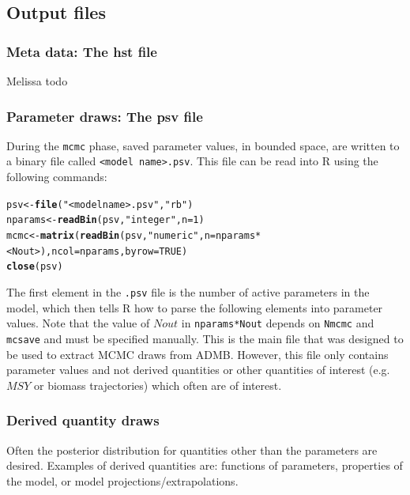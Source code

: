 \documentclass{article}\usepackage[]{graphicx}\usepackage[]{color}
\makeatletter
\newcommand{\hlstr}[1]{\textcolor[rgb]{0.192,0.494,0.8}{#1}}%
\newcommand{\hlkwd}[1]{\textcolor[rgb]{0.737,0.353,0.396}{\textbf{#1}}}%
\newenvironment{kframe}{%
 \def\at@end@of@kframe{}%
 \ifinner\ifhmode%
  \def\at@end@of@kframe{\end{minipage}}%
  \begin{minipage}{\columnwidth}%
 \fi\fi%
 \def\FrameCommand##1{\hskip\@totalleftmargin \hskip-\fboxsep
 \colorbox{shadecolor}{##1}\hskip-\fboxsep
     \hskip-\linewidth \hskip-\@totalleftmargin \hskip\columnwidth}%
 \MakeFramed {\advance\hsize-\width
   \@totalleftmargin\z@ \linewidth\hsize
   \@setminipage}}%
 {\par\unskip\endMakeFramed%
 \at@end@of@kframe}
\newenvironment{knitrout}{}{} %
\makeatother
\begin{document}
\subsection{Output files}\label{sec:outfiles}
\subsubsection{Meta data: The hst file}
Melissa todo
\subsubsection{Parameter draws: The psv file}
During the \texttt{mcmc} phase, saved parameter values, in
bounded space, are written to a binary file called
\texttt{<model name>.psv}. This file can be read into R
using the following commands:
\begin{knitrout}
\color{fgcolor}\begin{kframe}
\begin{alltt}
psv <- \hlkwd{file}(\hlstr{"<model name>.psv"}, \hlstr{"rb"})
nparams <- \hlkwd{readBin}(psv, \hlstr{"integer"}, n=1)
mcmc <- \hlkwd{matrix}(\hlkwd{readBin}(psv, \hlstr{"numeric"}, n=nparams*<Nout>), ncol=nparams, byrow=TRUE)
\hlkwd{close}(psv)
\end{alltt}
\end{kframe}
\end{knitrout}
The first element in the \texttt{.psv} file is the number of
active parameters in the model, which then tells R how to
parse the following elements into parameter values. Note
that the value of $Nout$ in \texttt{nparams*Nout} depends on
\texttt{Nmcmc} and \texttt{mcsave} and must be specified
manually. This is the main file that was designed to be used
to extract MCMC draws from ADMB. However, this file only
contains parameter values and not derived quantities or
other quantities of interest (e.g. $MSY$ or biomass
trajectories) which often are of interest.
\subsubsection{Derived quantity draws}
Often the posterior distribution for quantities other than
the parameters are desired. Examples of derived quantities
are: functions of parameters, properties of the model, or
model projections/extrapolations.
\end{document}
